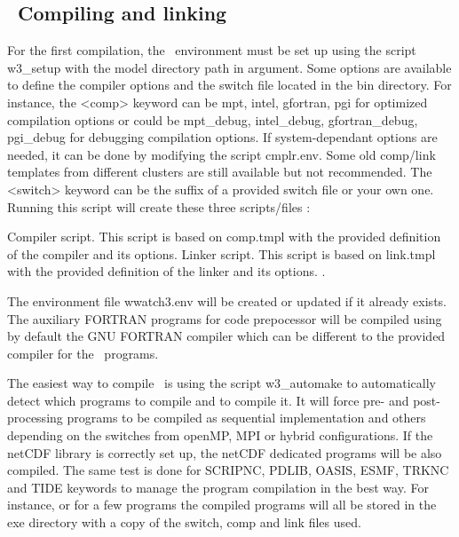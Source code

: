\vssub
\subsection{~Compiling and linking} \label{sec:comp}
\vssub

\vspace{\baselineskip} \noindent 
For the first compilation, the \ws\ environment must be set up using the script
{\file w3\_setup} with the model directory path in argument. Some options are
available to define the compiler options and the switch file located in the
{\dir bin} directory. For instance,  the {\code <comp>} keyword can be {\code mpt}, 
{\code intel}, {\code gfortran}, {\code pgi} for optimized compilation options
or could be {\code mpt\_debug}, {\code intel\_debug}, {\code gfortran\_debug},
{\code pgi\_debug} for debugging compilation options. If system-dependant
options are needed, it can be done by modifying the script {\file cmplr.env}. 
Some old comp/link templates from different clusters are still available but 
not recommended. The {\code <switch>} keyword can be the suffix of a provided
switch file or your own one. Running this script will create these three 
scripts/files :

\begin{flist}
  {Compiler script. This script is based on {\file comp.tmpl} with
	    the provided definition of the compiler and its options.}
  {Linker script. This script is based on {\file link.tmpl} with
	    the provided definition of the linker and its options.}
.
\end{flist}

\vspace{\baselineskip}

The environment file {\file wwatch3.env} will be created or updated if it 
already exists. The auxiliary FORTRAN programs for code prepocessor will be
compiled using by default the GNU FORTRAN compiler which can be different to
the provided compiler for the \ws\ programs.


\vspace{\baselineskip} \noindent 
The easiest way to compile \ws\ is using the script {\file w3\_automake} to 
automatically detect which programs to compile and to compile it. It will
force pre- and post-processing programs to be compiled as sequential 
implementation and others depending on the switches from openMP, MPI or hybrid
configurations. If the netCDF library is correctly set up, the netCDF dedicated
programs will be also compiled. The same test is done for SCRIPNC, PDLIB, OASIS,
ESMF, TRKNC and TIDE keywords to manage the program compilation in the best way.
For instance,  or for a few programs  the compiled programs will all be stored in the 
{\dir exe} directory with a copy of the switch, comp and link files used.

